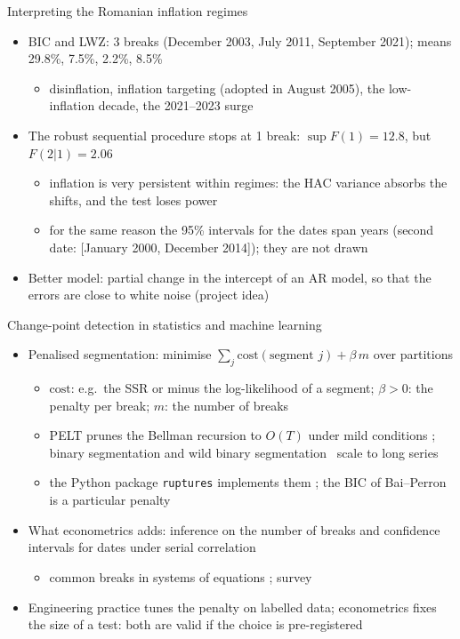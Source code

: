 \begin{frame}{Interpreting the Romanian inflation regimes}
\itemsize{\small}
\begin{itemize}
    \item BIC and LWZ: 3 breaks (December 2003, July 2011, September 2021); means 29.8\%, 7.5\%, 2.2\%, 8.5\%
    \begin{itemize}
        \item disinflation, inflation targeting (adopted in August 2005), the low-inflation decade, the 2021--2023 surge
    \end{itemize}
    \item The robust sequential procedure stops at 1 break: $\sup F(1) = 12.8$, but $F(2|1) = 2.06$
    \begin{itemize}
        \item inflation is very persistent within regimes: the HAC variance absorbs the shifts, and the test loses power
        \item for the same reason the 95\% intervals for the dates span years (second date: [January 2000, December 2014]); they are not drawn
    \end{itemize}
    \item Better model: partial change in the intercept of an AR model, so that the errors are close to white noise (project idea)
\end{itemize}
\end{frame}

\begin{frame}{Change-point detection in statistics and machine learning}
\itemsize{\small}
\begin{itemize}
    \item Penalised segmentation: minimise $\sum_j \mathrm{cost}(\text{segment } j) + \beta\,m$ over partitions
    \begin{itemize}
        \item $\mathrm{cost}$: e.g.\ the SSR or minus the log-likelihood of a segment; $\beta > 0$: the penalty per break; $m$: the number of breaks
        \item PELT prunes the Bellman recursion to $O(T)$ under mild conditions ; binary segmentation and wild binary segmentation \ scale to long series
        \item the Python package \texttt{ruptures} implements them ; the BIC of Bai--Perron is a particular penalty
    \end{itemize}
    \item What econometrics adds: inference on the number of breaks and confidence intervals for dates under serial correlation
    \begin{itemize}
        \item common breaks in systems of equations ; survey 
    \end{itemize}
    \item Engineering practice tunes the penalty on labelled data; econometrics fixes the size of a test: both are valid if the choice is pre-registered
\end{itemize}
\end{frame}


